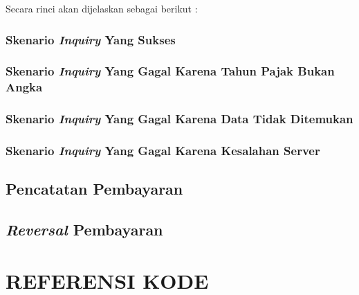 \documentclass[pdftex,12pt, oneside]{article}
\begin{document}
Secara rinci akan dijelaskan sebagai berikut :

\subsubsection{Skenario \textit{Inquiry} Yang Sukses}

\subsubsection{Skenario \textit{Inquiry} Yang Gagal Karena Tahun Pajak Bukan Angka}

\subsubsection{Skenario \textit{Inquiry} Yang Gagal Karena Data Tidak Ditemukan}

\subsubsection{Skenario \textit{Inquiry} Yang Gagal Karena Kesalahan Server}

\subsection{Pencatatan Pembayaran}

\subsection{\textit{Reversal} Pembayaran}

\section{REFERENSI KODE}
\end{document}
